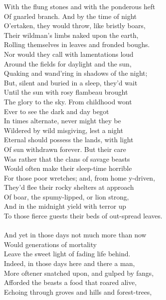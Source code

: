 With the flung stones and with the ponderous heft\\
Of gnarled branch. And by the time of night\\
O'ertaken, they would throw, like bristly boars,\\
Their wildman's limbs naked upon the earth,\\
Rolling themselves in leaves and fronded boughs.\\
Nor would they call with lamentations loud\\
Around the fields for daylight and the sun,\\
Quaking and wand'ring in shadows of the night;\\
But, silent and buried in a sleep, they'd wait\\
Until the sun with rosy flambeau brought\\
The glory to the sky. From childhood wont\\
Ever to see the dark and day begot\\
In times alternate, never might they be\\
Wildered by wild misgiving, lest a night\\
Eternal should possess the lands, with light\\
Of sun withdrawn forever. But their care\\
Was rather that the clans of savage beasts\\
Would often make their sleep-time horrible\\
For those poor wretches; and, from home y-driven,\\
They'd flee their rocky shelters at approach\\
Of boar, the spumy-lipped, or lion strong,\\
And in the midnight yield with terror up\\
To those fierce guests their beds of out-spread leaves.\\
\\
And yet in those days not much more than now\\
Would generations of mortality\\
Leave the sweet light of fading life behind.\\
Indeed, in those days here and there a man,\\
More oftener snatched upon, and gulped by fangs,\\
Afforded the beasts a food that roared alive,\\
Echoing through groves and hills and forest-trees,\\
